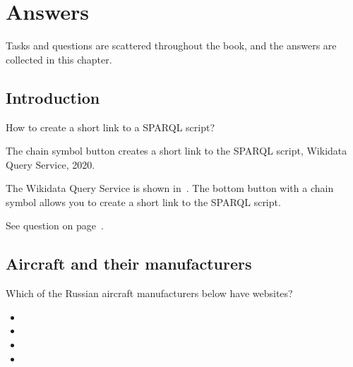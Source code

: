 \chapter{Answers}


Tasks and questions are scattered throughout the book, 
and the answers are collected in this chapter.


\section{Introduction}


\begin{exercise}%
    \label{answer:short-link-to-SPARQL}
How to create a short link to a SPARQL script?
\end{exercise}

\begin{marginfigure}[0cm]
    {%
        \setlength{\fboxsep}{0pt}
        \setlength{\fboxrule}{1pt}
    }
	\caption{The chain symbol button creates a short link to the SPARQL script, Wikidata Query Service, 2020.}
\end{marginfigure}

The Wikidata Query Service is shown in~. 
The bottom button with a chain symbol allows you to create a short link to the SPARQL script. 

See question on page~\pageref{question:short-link-to-SPARQL}.



\section{Aircraft and their manufacturers}


\begin{exercise}%
    \label{answer:aircraft_manufacturers_en}
Which of the Russian aircraft manufacturers below have websites?
\begin{itemize}
\item {}
\item {}
\item {}
\item {}
\end{itemize}
\end{exercise}

